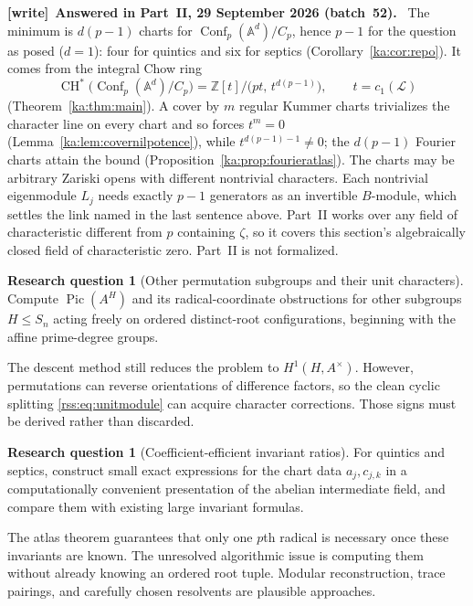 \documentclass[11pt,a4paper]{article}
\theoremstyle{definition}
\newtheorem{question}[theorem]{Research question}
\theoremstyle{remark}
\newcommand{\Z}{\mathbb Z}
\newcommand{\Pic}{\operatorname{Pic}}
\newenvironment{writenote}[1][]{\par\smallskip\begingroup\small
 \noindent\textbf{[write]}\if\relax\detokenize{#1}\relax\else~\textbf{#1.}\fi\ }%
 {\par\endgroup\smallskip}
\newcommand{\A}{\mathbb A}
\newcommand{\LL}{\mathcal L}
\newcommand{\CH}{\operatorname{CH}}
\newcommand{\Conf}{\operatorname{Conf}}
\begin{document}
\begin{writenote}[Answered in Part~II, 29 September 2026 (batch~52)]
The minimum is $d(p-1)$ charts for $\Conf_p(\A^d)/C_p$, hence $p-1$ for the
question as posed ($d=1$): four for quintics and six for septics
(Corollary~\ref{ka:cor:repo}). It comes from the integral Chow ring
\[
 \CH^*\bigl(\Conf_p(\A^d)/C_p\bigr)=\Z[t]/\bigl(pt,\,t^{d(p-1)}\bigr),
 \qquad t=c_1(\LL)
\]
(Theorem~\ref{ka:thm:main}). A cover by $m$ regular Kummer charts
trivializes the character line on every chart and so forces $t^m=0$
(Lemma~\ref{ka:lem:covernilpotence}), while $t^{d(p-1)-1}\neq0$; the $d(p-1)$
Fourier charts attain the bound (Proposition~\ref{ka:prop:fourieratlas}). The
charts may be arbitrary Zariski opens with different nontrivial characters.
Each nontrivial eigenmodule $L_j$ needs exactly $p-1$ generators as an
invertible $B$-module, which settles the link named in the last sentence
above. Part~II works over any field of characteristic different from $p$
containing $\zeta$, so it covers this section's algebraically closed field of
characteristic zero. Part~II is not formalized.
\end{writenote}

\begin{question}[Other permutation subgroups and their unit characters]
Compute $\Pic(A^H)$ and its radical-coordinate obstructions for other
subgroups $H\leq S_n$ acting freely on ordered distinct-root
configurations, beginning with the affine prime-degree groups.
\end{question}
The descent method still reduces the problem to $H^1(H,A^\times)$.
However, permutations can reverse orientations of difference factors, so
the clean cyclic splitting \eqref{rss:eq:unitmodule} can acquire character
corrections. Those signs must be derived rather than discarded.

\begin{question}[Coefficient-efficient invariant ratios]
For quintics and septics, construct small exact expressions for the
chart data $a_j,c_{j,k}$ in a computationally convenient presentation of
the abelian intermediate field, and compare them with existing large
invariant formulas.
\end{question}
The atlas theorem guarantees that only one $p$th radical is necessary once
these invariants are known. The unresolved algorithmic issue is computing
them without already knowing an ordered root tuple. Modular reconstruction,
trace pairings, and carefully chosen resolvents are plausible approaches.
\end{document}
